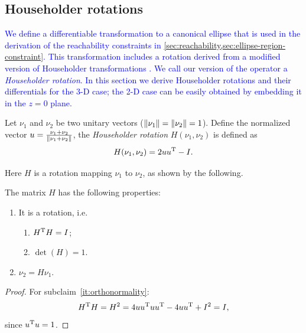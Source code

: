 \documentclass[10pt,twocolumn,twoside]{IEEEtran}
\newcommand{\new}[1]{\textcolor{blue}{#1}}
\begin{document}
{\subsection{Householder rotations}\label{sec:householder}
\new{We define a differentiable transformation to a canonical ellipse that is used in the derivation of the reachability constraints in \cref{sec:reachability,sec:ellipse-region-constraint}. This transformation includes a rotation derived from a modified version of Householder transformations \cite{householder1958unitary}. 
We call our version of the operator a \emph{Householder rotation}. In this section we derive Householder rotations and their differentials for the 3-D case; the 2-D case can be easily obtained by embedding it in the $z=0$ plane.}
\begin{definition} Let $\nu_1$ and $\nu_2$ be two unitary vectors ($\lVert\nu_1\rVert=\lVert\nu_2\rVert=1$). Define the normalized vector $u = \frac{\nu_1+\nu_2}{\lVert\nu_1+\nu_2\rVert}$,
the \emph{Householder rotation} $H(\nu_1,\nu_2)$ is defined as
  \begin{equation}\label{eq:H definition}
    H(\nu_1,\nu_2) = 2 u u^\mathrm{T}-I.
  \end{equation}
\end{definition}
Here $H$ is a rotation mapping $\nu_1$ to $\nu_2$, as shown by the following.
\begin{proposition}\label{prop:HProperty}
  The matrix $H$ has the following properties:
  \begin{enumerate}
  \item It is a rotation, i.e.
    \begin{enumerate}
    \item\label{it:orthonormality} $H^\mathrm{T} H=I$;
    \item\label{it:determinant} $\det(H)=1$.
    \end{enumerate}
  \item\label{it:transformation} $\nu_2=H \nu_1$.
  \end{enumerate}
\end{proposition}
\begin{proof}
  For subclaim~\ref{it:orthonormality}:
  \begin{equation}
    H^\mathrm{T} H=H^2=4uu^\mathrm{T} u u^\mathrm{T} - 4uu^\mathrm{T} +I^2=I,
  \end{equation}
  since $u^\mathrm{T} u=1$.


\end{proof}}
\end{document}
